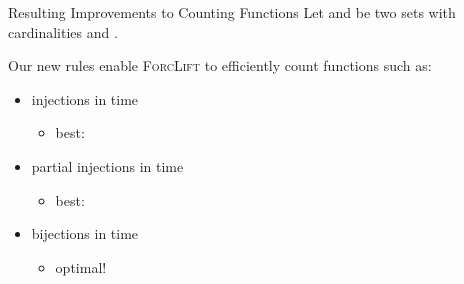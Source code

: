 \documentclass{beamer}
\begin{document}

\begin{frame}{Resulting Improvements to Counting Functions}
  Let  and  be two sets with cardinalities
   and .

  Our new rules enable \textsc{ForcLift} to efficiently count
   functions such as:
  \begin{itemize}
    \item injections in  time
          \begin{itemize}
            \item best: 
          \end{itemize}
    \item partial injections in  time
          \begin{itemize}
            \item best: 
          \end{itemize}
          \item bijections in  time
          \begin{itemize}
            \item \alert{optimal!}
          \end{itemize}
  \end{itemize}
\end{frame}
\end{document}

